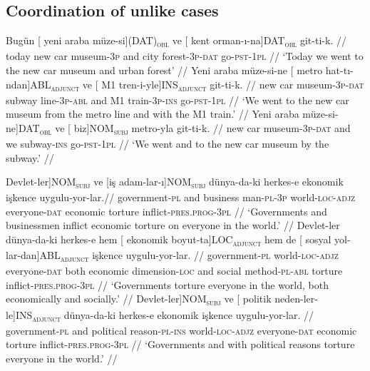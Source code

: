 \subsection{Coordination of unlike cases}


\pex[exno=TS1, glspace=!1em,everygla={},everyglb={},aboveglbskip=-.15ex, interpartskip=15pt]
\label{TS1-case}
\a
\begingl
\gla Bugün {[} yeni araba {müze-si]}(DAT)\textsubscript{\textsc{obl}} ve {[} kent {orman-ı-na]}DAT\textsubscript{\textsc{obl}} git-ti-k. //
\glb today new car museum-\textsc{3p} and city forest-\textsc{3p}-\textsc{dat} go-\textsc{pst}-\textsc{1pl} //
\glft `Today we went to the new car museum and urban forest' //
\endgl
\a
\begingl
\gla Yeni araba müze-si-ne {[} metro {hat-tı-ndan]}ABL\textsubscript{\textsc{adjunct}} ve {[} M1 {tren-i-yle]}INS\textsubscript{\textsc{adjunct}} git-ti-k. //
\glb new car museum-\textsc{3p}-\textsc{dat} subway line-\textsc{3p}-\textsc{abl} and M1 train-\textsc{3p}-\textsc{ins} go-\textsc{pst}-\textsc{1pl} //
\glft `We went to the new car museum from the metro line and with the M1 train.' //
\endgl
\a
\begingl
\gla {[} Yeni araba {müze-si-ne]}DAT\textsubscript{\textsc{obl}} ve {[} {biz]}NOM\textsubscript{\textsc{subj}} metro-yla git-ti-k. //
\glb new car museum-\textsc{3p}-\textsc{dat} and we subway-\textsc{ins} go-\textsc{pst}-\textsc{1pl} //
\glft `We went and to the new car museum by the subway.' //
\endgl
\xe


\pex[exno=TS2, glspace=!1em,everygla={},everyglb={},aboveglbskip=-.15ex, interpartskip=15pt]
\label{TS2-case}
\a
\begingl
\gla {[} {Devlet-ler]}NOM\textsubscript{\textsc{subj}} ve {[}iş {adam-lar-ı]}NOM\textsubscript{\textsc{subj}} dünya-da-ki herkes-e ekonomik işkence uygulu-yor-lar.//
\glb government-\textsc{pl} and business man-\textsc{pl}-\textsc{3p} world-\textsc{loc}-\textsc{adjz} everyone-\textsc{dat} economic torture inflict-\textsc{pres.prog}-\textsc{3pl}  //
\glft `Governments and businessmen inflict economic torture on everyone in the world.' //
\endgl
\a
\begingl
\gla Devlet-ler dünya-da-ki herkes-e hem {[} ekonomik {boyut-ta]}LOC\textsubscript{\textsc{adjunct}} {hem de} {[} sosyal {yol-lar-dan]}ABL\textsubscript{\textsc{adjunct}} işkence uygulu-yor-lar. //
\glb government-\textsc{pl} world-\textsc{loc}-\textsc{adjz} everyone-\textsc{dat} both economic dimension-\textsc{loc} and social method-\textsc{pl}-\textsc{abl} torture inflict-\textsc{pres.prog}-\textsc{3pl} //
\glft `Governments torture everyone in the world, both economically and socially.' //
\endgl
\a
\begingl
\gla {[} {Devlet-ler]}NOM\textsubscript{\textsc{subj}} ve {[} politik {neden-ler-le]}INS\textsubscript{\textsc{adjunct}} dünya-da-ki herkes-e ekonomik işkence uygulu-yor-lar. //
\glb government-\textsc{pl} and political reason-\textsc{pl}-\textsc{ins} world-\textsc{loc}-\textsc{adjz} everyone-\textsc{dat} economic torture inflict-\textsc{pres.prog}-\textsc{3pl} //
\glft `Governments and with political reasons torture everyone in the world.' //
\endgl
\xe


